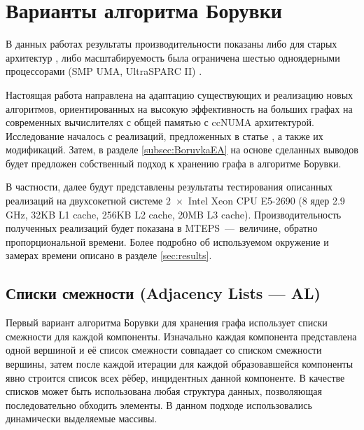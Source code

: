 \documentclass[a4paper,10pt]{extarticle}
\begin{document}

\section{Варианты алгоритма Борувки}
\label{sec:boruvkaIntro}
В данных работах \cite{dense-mst,boruvka-prima,boruvka-cm5} результаты производительности показаны либо для старых архитектур \cite{dense-mst,boruvka-cm5}, либо масштабируемость была ограничена шестью одноядерными процессорами (SMP  UMA, UltraSPARC II) \cite{boruvka-prima}.

Настоящая работа направлена на адаптацию существующих и реализацию новых алгоритмов, ориентированных на высокую эффективность на больших графах на современных вычислителях с общей памятью с ccNUMA архитектурой.
Исследование началось с реализаций, предложенных в статье \cite{boruvka-prima}, а также их модификаций. Затем, в разделе \ref{subsec:BoruvkaEA} на основе сделанных выводов будет предложен собственный подход к хранению графа в алгоритме Борувки.

В частности, далее будут представлены результаты тестирования описанных реализаций на двухсокетной системе $2$~$\times$~Intel Xeon CPU E5-2690 (8 ядер 2.9 GHz, 32KB L1 cache, 256KB L2 cache, 20MB L3 cache). Производительность полученных реализаций будет показана в MTEPS~---~величине, обратно пропорциональной времени. Более подробно об используемом окружение и замерах времени описано в разделе \ref{sec:results}.

\subsection{Списки смежности (Adjacency Lists --- AL)}
\label{subsec:boruvkaAL}

Первый вариант алгоритма Борувки для хранения графа использует списки смежности для каждой компоненты. Изначально каждая компонента представлена одной вершиной и её список смежности совпадает со списком смежности вершины, затем после каждой итерации для каждой образовавшейся компоненты явно строится список всех рёбер, инцидентных данной компоненте.
В качестве списков может быть использована любая структура данных, позволяющая последовательно обходить элементы. В данном подходе использовались динамически выделяемые массивы.
\end{document}
